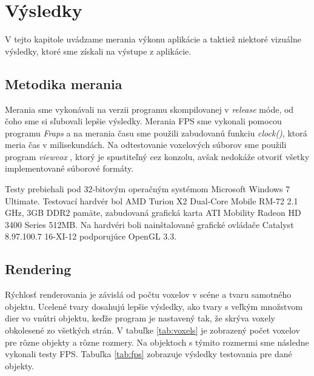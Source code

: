 \chapter{Výsledky}\label{chap:vyledky}
V tejto kapitole uvádzame merania výkonu aplikácie a taktiež niektoré vizuálne výsledky, ktoré sme získali na výstupe z aplikácie.

\section{Metodika merania}
Merania sme vykonávali na verzii programu skompilovanej v \textit{release} móde, od čoho sme si sľubovali lepšie výsledky. Merania FPS sme vykonali pomocou programu \textit{Fraps} \cite{fraps} a na merania času sme použili  zabudovanú funkciu \textit{clock()}, ktorá meria čas v milisekundách. Na odtestovanie voxelových súborov sme použili program \textit{viewvox} \cite{viewvox}, ktorý je spustiteľný cez konzolu, avšak nedokáže otvoriť všetky implementované súborové formáty.

Testy prebiehali pod 32-bitovým operačným systémom Microsoft Windows 7 Ultimate. Testovací hardvér bol AMD Turion X2 Dual-Core Mobile RM-72 2.1 GHz, 3GB DDR2 pamäte, zabudovaná grafická karta ATI Mobility Radeon HD 3400 Series 512MB. Na hardvéri boli nainštalované grafické ovládače Catalyst 8.97.100.7 16-XI-12 podporujúce OpenGL 3.3.

\section{Rendering}

Rýchlosť renderovania je závislá od počtu voxelov v scéne a tvaru samotného objektu. Ucelené tvary dosahujú lepšie výsledky, ako tvary s veľkým množstvom dier vo vnútri objektu, keďže program je nastavený tak, že skrýva voxely obkolesené zo všetkých strán.
V tabuľke \ref{tab:voxels} je zobrazený počet voxelov pre rôzne objekty a rôzne rozmery. Na objektoch s týmito rozmermi sme následne vykonali testy FPS. Tabuľka \ref{tab:fps} zobrazuje  výsledky testovania pre dané objekty. \\

